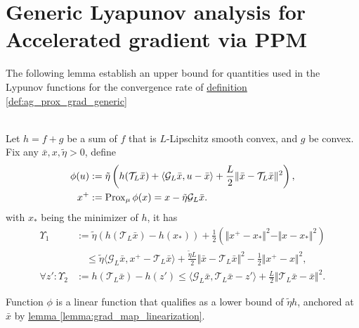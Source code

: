 \documentclass[12pt]{article}
\begin{document}
\section{Generic Lyapunov analysis for Accelerated gradient via PPM}
\label{sec:generic_ag_ppm_lyapunov_analysis}
    The following lemma establish an upper bound for quantities used in the Lypunov functions for the convergence rate of 
    \hyperref[def:ag_prox_grad_generic]
    {definition \ref*{def:ag_prox_grad_generic}}
    \begin{lemma}
    \label{lemma:nsmooth_agg_lyapunov_upper_bound}\;\\
        Let $h = f + g$ be a sum of $f$ that is $L$-Lipschitz smooth convex, and $g$ be convex.
        Fix any $\bar x, x, \tilde\eta > 0$, define
        \begin{align*}
            \phi(u) &:= \tilde\eta
            \left(
                h( \mathcal T_L\bar x) + \langle \mathcal G_L\bar x, u - \bar x\rangle
                + \frac{L}{2}\Vert \bar x - \mathcal T_L \bar x\Vert^2 
            \right), 
            \\
            x^+ &:= 
            \operatorname{Prox}_{\mu}{\phi}(x) = x - \tilde \eta\mathcal G_L \bar x. 
        \end{align*}
        with $x_*$ being the minimizer of $h$, it has 
        \begin{align*}
            \Upsilon_{1}  &:= 
            \tilde \eta(h(\mathcal T_L \bar x) - h(x_*))
            + 
            \frac{1}{2}(\Vert x^+ - x_*\Vert^2 - \Vert x - x_*\Vert^2)
            \\
            &\quad \le 
            \tilde \eta 
            \langle \mathcal G_L\bar x, x^+ - \mathcal T_L \bar x\rangle
            + 
            \frac{\tilde \eta L}{2} \Vert \bar x - \mathcal T_L \bar x\Vert^2
            - 
            \frac{1}{2}\Vert x^+ - x\Vert^2, 
            \\
            \forall z':
            \Upsilon_2 &:= 
            h(\mathcal T_L \bar x) - h(z') 
            \le 
            \langle \mathcal G_L\bar x, \mathcal T_L \bar x - z'\rangle + 
            \frac{L}{2}\Vert \mathcal T_L \bar x - \bar x\Vert^2. 
        \end{align*}
    \end{lemma}
    \begin{observation}
        Function $\phi$ is a linear function that qualifies as a lower bound of $\tilde \eta h$, anchored at $\bar x$ by 
        \hyperref[lemma:grad_map_linearization]{lemma \ref*{lemma:grad_map_linearization}}.
    \end{observation}
\end{document}
